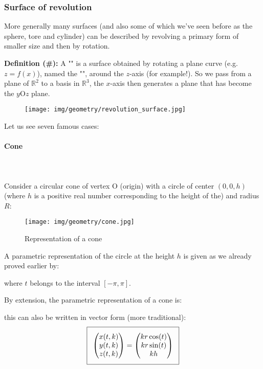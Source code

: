 {	
	
	\pagebreak
	\subsubsection{Surface of revolution}
	More generally many surfaces (and also some of which we've seen before as the sphere, tore and cylinder) can be described by revolving a primary form of smaller size and then by rotation.
	
	\textbf{Definition (\#\mydef):} A "" is a surface obtained by rotating a plane curve (e.g. $z=f(x)$), named the "", around the $z$-axis (for example!). So we pass from a plane of $\mathbb{R}^2$ to a basis in $\mathbb{R}^3$, the $x$-axis then generates a plane that has become the $y$O$z$ plane.
	\begin{figure}[H]
		\centering
		\texttt{[image: img/geometry/revolution\_surface.jpg]}
	\end{figure}
	Let us see seven famous cases:
	
	\paragraph{Cone}\mbox{}\\\\
	Consider a circular cone of vertex O (origin) with a circle of center $(0,0, h)$ (where $h$ is a positive real number corresponding to the height of the) and radius $R$:
	\begin{figure}[H]
		\centering
		\texttt{[image: img/geometry/cone.jpg]}
		\caption{Representation of a cone}
	\end{figure}
	A parametric representation of the circle at the height $h$ is given as we already proved earlier by:
	
	where $t$ belongs to the interval $[-\pi,\pi]$.
	
	By extension, the parametric representation of a cone is:
	
	this can also be written in vector form (more traditional):
	\begin{equation}
	  \addtolength{\fboxsep}{5pt}
	   \boxed{
	   \begin{gathered}
	   		\begin{pmatrix}
	   		x(t,k)\\y(t,k)\\z(t,k)
	   		\end{pmatrix}=
	   		\begin{pmatrix}
	   		kr\cos(t)\\kr\sin(t)\\kh
	   		\end{pmatrix}
	   \end{gathered}
	   }
	\end{equation}
	
}
